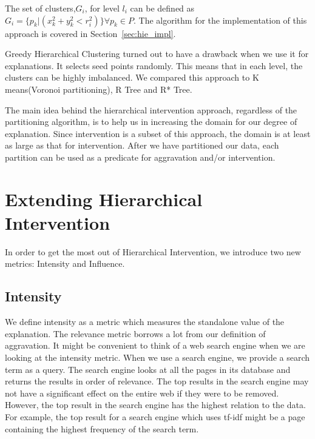 The set of clusters,$G_i$, for level $l_i$ can be defined as $G_i=\{p_k|(x_k^2 + y_k^2 < r_i^2)\}\forall p_k \in P$. The algorithm for the implementation of this approach is covered in Section~\ref{sec:hie_impl}.

Greedy Hierarchical Clustering turned out to have a drawback when we use it for explanations. It selects seed points randomly. This means that in each level, the clusters can be highly imbalanced. We compared this approach to K means(Voronoi partitioning)\citep{hartigan1979algorithm,aurenhammer2000voronoi}, R Tree\citep{guttman1984r} and R* Tree\citep{beckmann1990r}.

The main idea behind the hierarchical intervention approach, regardless of the partitioning algorithm, is to help us in increasing the domain for our degree of explanation. Since intervention is a subset of this approach, the domain is at least as large as that for intervention. After we have partitioned our data, each partition can be used as a predicate for aggravation and/or intervention.

\section{Extending Hierarchical Intervention}
\label{sec:extending_hi}

In order to get the most out of Hierarchical Intervention, we introduce two new metrics: Intensity and Influence.

\subsection{Intensity}
\label{sec:intensity}

We define intensity as a metric which measures the standalone value of the explanation. The relevance metric borrows a lot from our definition of aggravation. It might be convenient to think of a web search engine when we are looking at the intensity metric. When we use a search engine, we provide a search term as a query. The search engine looks at all the pages in its database and returns the results in order of relevance. The top results in the search engine may not have a significant effect on the entire web if they were to be removed. However, the top result in the search engine has the highest relation to the data. For example, the top result for a search engine which uses tf-idf might be a page containing the highest frequency of the search term\citep{robertson2004understanding}.

